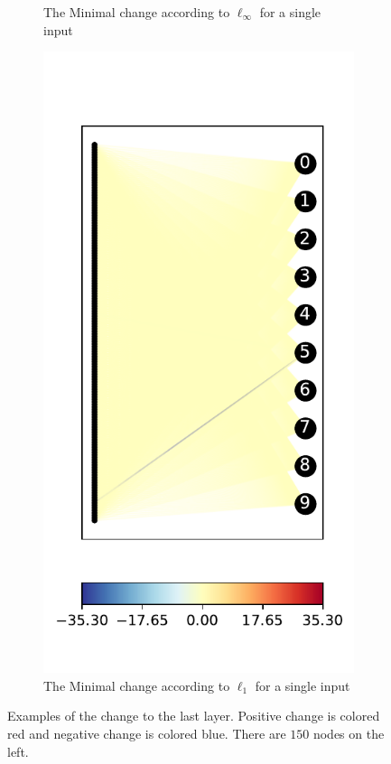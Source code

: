 \documentclass{easychair}
\begin{document}
\begin{figure}
\begin{subfigure}{0.4\linewidth}
     \caption{The Minimal change according to $\ell_\infty$ for a single input}
  \end{subfigure}
  \begin{subfigure}{0.4\linewidth}
    \includegraphics[width=\linewidth]{../data/results/problem2/last_layer_1_wm_example.pdf}
    \caption{The Minimal change according to $\ell_1$ for a single input}
  \end{subfigure}
  \caption{Examples of the change to the last layer. Positive change is colored red and negative change is colored blue. There are $150$ nodes on the left.}
  \label{fig:lastLayerExampleSingle}
\end{figure}
\end{document}
